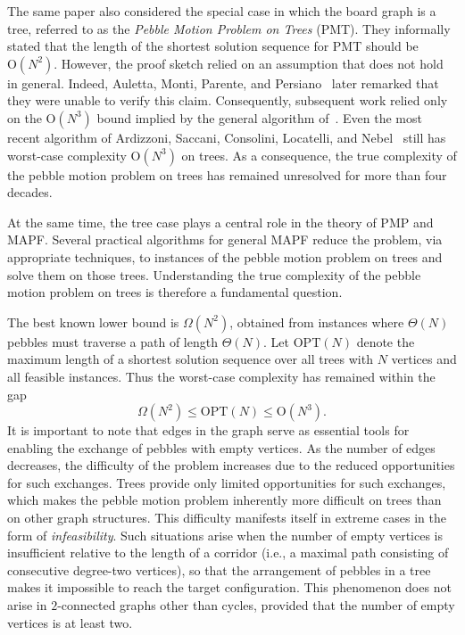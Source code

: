 \documentclass[letter,11pt]{article}
\theoremstyle{definition}
\theoremstyle{definition}
\newcommand{\1}{\boldmath$~1~$\unboldmath}
\newcommand{\Ord}{\mathrm{O}}
\newcommand{\OPT}{\mathrm{OPT}}
\begin{document}
The same paper also considered the special case in which the board
graph is a tree, referred to as the \textit{Pebble Motion Problem on Trees} (PMT).
They informally stated that the length of the shortest solution
sequence for PMT should be $\Ord(N^2)$.
However, the proof sketch relied on an assumption that does not hold
in general.
Indeed, Auletta, Monti, Parente, and Persiano~\cite{WOS:000077614700003} later remarked
that they were unable to verify this claim.
Consequently, subsequent work relied only on the $\Ord(N^3)$ bound
implied by the general algorithm of~\cite{715921}.
Even the most recent algorithm of Ardizzoni, Saccani, Consolini, Locatelli, 
and Nebel~\cite{WOS:001177663400002} still has worst-case complexity 
$\Ord(N^3)$ on trees.
As a consequence, the true complexity of the pebble motion problem on
trees has remained unresolved for more than four decades.

At the same time, the tree case plays a central role in the theory of
PMP and MAPF.
Several practical algorithms for general MAPF reduce the problem,
via appropriate techniques, to instances of the pebble motion problem
on trees and solve them on those trees.
Understanding the true complexity of the pebble motion problem on
trees is therefore a fundamental question.

The best known lower bound is $\Omega(N^2)$, obtained from instances
where $\Theta(N)$ pebbles must traverse a path of length $\Theta(N)$.
Let $\OPT(N)$ denote the maximum length of a shortest solution
sequence over all trees with $N$ vertices and all feasible instances.
Thus the worst-case complexity has remained within the gap
\[ 
\Omega(N^2) \le \OPT(N) \le \Ord(N^3).
\]
It is important to note that edges in the graph serve as essential tools 
for enabling the exchange of pebbles with empty vertices. 
As the number of edges decreases, the difficulty of the problem increases 
due to the reduced opportunities for such exchanges. 
Trees provide only limited opportunities for such exchanges, 
which makes the pebble motion problem inherently more difficult
on trees than on other graph structures.
This difficulty manifests itself in extreme cases in the form of {\it infeasibility}. 
Such situations arise when the number of empty vertices is insufficient 
relative to the length of a corridor (i.e., a maximal path consisting of 
consecutive degree-two vertices), so that the arrangement of pebbles in 
a tree makes it impossible to reach the target configuration. 
This phenomenon does not arise in $2$-connected graphs other than cycles,  
provided that the number of empty vertices is at least two.
\end{document}
